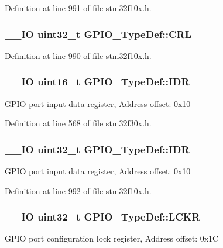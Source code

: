 Definition at line 991 of file stm32f10x.\-h.

\hypertarget{struct_g_p_i_o___type_def_a218d21e9ca712cec4ca8f00406b2ec29}{
\subsubsection[{C\-R\-L}]{\setlength{\rightskip}{0pt plus 5cm}\-\_\-\-\_\-\-I\-O {\bf uint32\-\_\-t} G\-P\-I\-O\-\_\-\-Type\-Def\-::\-C\-R\-L}}\label{struct_g_p_i_o___type_def_a218d21e9ca712cec4ca8f00406b2ec29}


Definition at line 990 of file stm32f10x.\-h.

\hypertarget{struct_g_p_i_o___type_def_a906a2c895ee5b66f35421e994c8a2b7c}{
\subsubsection[{I\-D\-R}]{\setlength{\rightskip}{0pt plus 5cm}\-\_\-\-\_\-\-I\-O {\bf uint16\-\_\-t} G\-P\-I\-O\-\_\-\-Type\-Def\-::\-I\-D\-R}}\label{struct_g_p_i_o___type_def_a906a2c895ee5b66f35421e994c8a2b7c}
G\-P\-I\-O port input data register, Address offset\-: 0x10 

Definition at line 568 of file stm32f30x.\-h.

\hypertarget{struct_g_p_i_o___type_def_acf11156409414ad8841bb0b62959ee96}{
\subsubsection[{I\-D\-R}]{\setlength{\rightskip}{0pt plus 5cm}\-\_\-\-\_\-\-I\-O {\bf uint32\-\_\-t} G\-P\-I\-O\-\_\-\-Type\-Def\-::\-I\-D\-R}}\label{struct_g_p_i_o___type_def_acf11156409414ad8841bb0b62959ee96}
G\-P\-I\-O port input data register, Address offset\-: 0x10 

Definition at line 992 of file stm32f10x.\-h.

\hypertarget{struct_g_p_i_o___type_def_a95a59d4b1d52be521f3246028be32f3e}{
\subsubsection[{L\-C\-K\-R}]{\setlength{\rightskip}{0pt plus 5cm}\-\_\-\-\_\-\-I\-O {\bf uint32\-\_\-t} G\-P\-I\-O\-\_\-\-Type\-Def\-::\-L\-C\-K\-R}}\label{struct_g_p_i_o___type_def_a95a59d4b1d52be521f3246028be32f3e}
G\-P\-I\-O port configuration lock register, Address offset\-: 0x1\-C 

